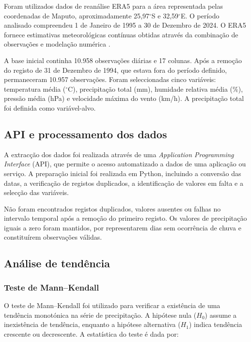 \documentclass[9pt,twocolumn,twoside,english,portuguese]{opticajnl}
\begin{document}
Foram utilizados dados de reanálise ERA5 para a área representada pelas
coordenadas de Maputo, aproximadamente 25,97$^\circ$S e 32,59$^\circ$E. O
período analisado compreendeu 1 de Janeiro de 1995 a 30 de Dezembro de 2024.
O ERA5 fornece estimativas meteorológicas contínuas obtidas através da
combinação de observações e modelação numérica
\cite{Hersbach2020ERA5}.

A base inicial continha 10.958 observações diárias e 17 colunas. Após a
remoção do registo de 31 de Dezembro de 1994, que estava fora do período
definido, permaneceram 10.957 observações. Foram seleccionadas cinco
variáveis: temperatura média ($^\circ$C), precipitação total (mm), humidade
relativa média (\%), pressão média (hPa) e velocidade máxima do vento (km/h).
A precipitação total foi definida como variável-alvo.


\subsection{API e processamento dos dados}

A extracção dos dados foi realizada através de uma
\textit{Application Programming Interface} (API), que permite o acesso
automatizado a dados de uma aplicação ou serviço. A preparação inicial foi
realizada em Python, incluindo a conversão das datas, a verificação de
registos duplicados, a identificação de valores em falta e a selecção das
variáveis.

Não foram encontrados registos duplicados, valores ausentes ou falhas no
intervalo temporal após a remoção do primeiro registo. Os valores de
precipitação iguais a zero foram mantidos, por representarem dias sem
ocorrência de chuva e constituírem observações válidas.

\subsection{Análise de tendência}

\subsubsection{Teste de Mann--Kendall}

O teste de Mann--Kendall foi utilizado para verificar a existência de uma
tendência monotónica na série de precipitação. A hipótese nula ($H_0$)
assume a inexistência de tendência, enquanto a hipótese alternativa ($H_1$)
indica tendência crescente ou decrescente. A estatística do teste é dada por:
\end{document}
